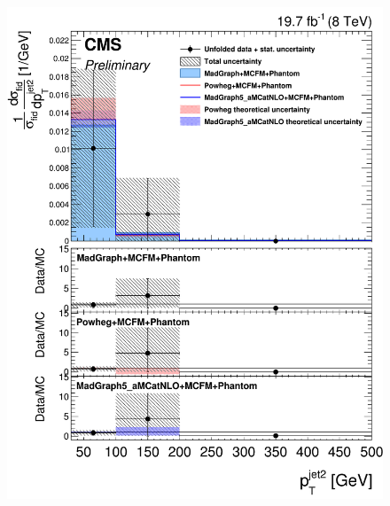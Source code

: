 \begin{figure}[hbtp]
  \begin{center}
    \includegraphics[width=\cmsFigWidth]{Figures/DiffCrossSecZZTo4mPtJet2_Unfolded_fr_MadGraph_norm.png}     

\end{center}
\end{figure}
